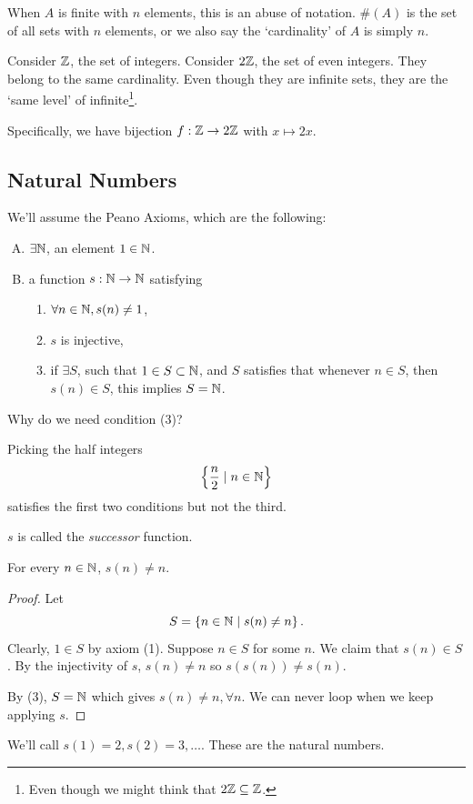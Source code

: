 \begin{remark}
    When $A$ is finite with $n$ elements, this is an abuse of notation. $\#(A)$ is the set of all sets with $n$ elements, or we also say the `cardinality' of $A$ is simply $n$.
\end{remark}

\begin{example}
    Consider $\mathbb Z$, the set of integers. Consider $2\mathbb Z$, the set of even integers. They belong to the same cardinality. Even though they are infinite sets, they are the `same level' of infinite\footnote{Even though we might think that $2\mathbb Z\subseteq \mathbb Z$.}.

    Specifically, we have bijection $f: \mathbb Z\to 2\mathbb Z$ with $x\mapsto 2x$.
\end{example}

\subsection{Natural Numbers}
We'll assume the Peano Axioms, which are the following:
\begin{enumerate}[A.]
    \item $\exists \mathbb N$, an element $1\in \mathbb N$.
    \item a function $s: \mathbb N\to \mathbb N$ satisfying
          \begin{enumerate}[(1)]
              \item $\forall n\in \mathbb N, s(n) \neq 1$,
              \item $s$ is injective,
              \item if $\exists S$, such that $1\in S\subset \mathbb N$, and $S$ satisfies that whenever $n\in S$, then $s(n)\in S$, this implies $S = \mathbb N$.
          \end{enumerate}
\end{enumerate}

Why do we need condition (3)?
\begin{example}
    Picking the half integers
    \[\left\{\frac{n}{2}\mid n\in \mathbb N\right\}\]
    satisfies the first two conditions but not the third.
\end{example}

$s$ is called the \emph{successor} function.

\begin{proposition}
    For every $n\in \mathbb N$, $s(n)\neq n$.
\end{proposition}
\begin{proof}
    Let
    \[S = \left\{ n\in \mathbb N\mid s(n) \neq n \right\}.\]
    Clearly, $1\in S$ by axiom (1). Suppose $n\in S$ for some $n$. We claim that $s(n)\in S$. By the injectivity of $s$, $s(n)\neq n$ so $s(s(n)) \neq s(n)$.

    By (3), $S = \mathbb N$ which gives $s(n)\neq n, \forall n$. We can never loop when we keep applying $s$.
\end{proof}
\begin{definition}
    We'll call $s(1) = 2, s(2) = 3, \dots$. These are the natural numbers.
\end{definition}